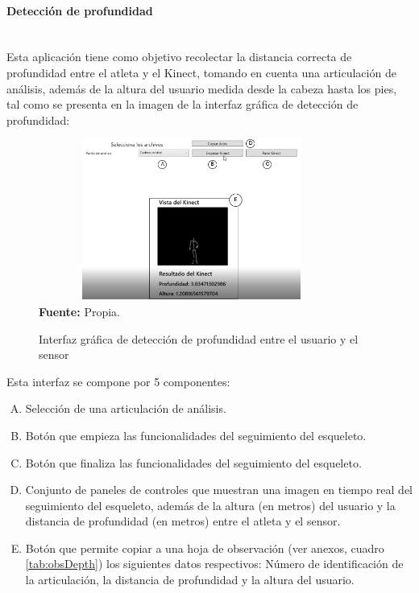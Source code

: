 \paragraph{Detecci\'on de profundidad}\mbox{} \\ \label{ins:UI:wpf:depth}
Esta aplicaci\'on tiene como objetivo recolectar la distancia correcta de profundidad entre el atleta y el Kinect, tomando en cuenta una articulaci\'on de an\'alisis, adem\'as de la altura del usuario medida desde la cabeza hasta los pies, tal como se presenta en la imagen de la interfaz gr\'afica de detecci\'on de profundidad:
\begin{figure}[H]
	\caption{Interfaz gr\'afica de detecci\'on de profundidad entre el usuario y el sensor}
	\label{fig:appDepth}
	\centering
	\includegraphics[width=380px,height=200px]{graphics/appProfundidad.png} \\
	\textbf{Fuente:} Propia.
\end{figure}
Esta interfaz se compone por 5 componentes:
\begin{enumerate}[A.]
    \item Selecci\'on de una articulaci\'on de an\'alisis.
    \item Bot\'on que empieza las funcionalidades del seguimiento del esqueleto.
    \item Bot\'on que finaliza las funcionalidades del seguimiento del esqueleto.
    \item Conjunto de paneles de controles que muestran una imagen en tiempo real del seguimiento del esqueleto, adem\'as de la altura (en metros) del usuario y la distancia de profundidad (en metros) entre el atleta y el sensor.
        \item Bot\'on que permite copiar a una hoja de observaci\'on (ver anexos, cuadro \ref{tab:obsDepth}) los siguientes datos respectivos: N\'umero de identificaci\'on de la articulaci\'on, la distancia de profundidad y la altura del usuario.
\end{enumerate}
